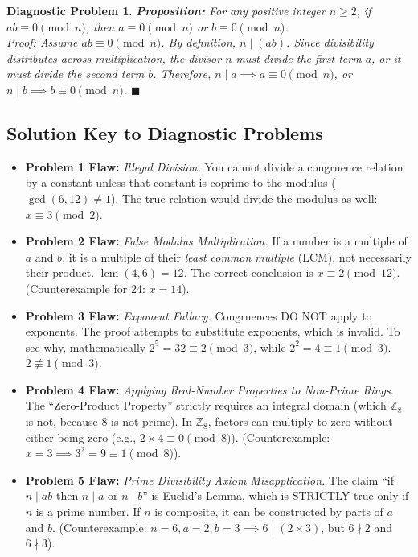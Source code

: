 \documentclass[11pt]{article}
\newtheorem{flawprob}{Diagnostic Problem}
\begin{document}
\begin{flawprob}
\textbf{Proposition:} For any positive integer $n \ge 2$, if $ab \equiv 0 \pmod n$, then $a \equiv 0 \pmod n$ or $b \equiv 0 \pmod n$. \\
\textit{Proof:} Assume $ab \equiv 0 \pmod n$. By definition, $n \mid (ab)$. Since divisibility distributes across multiplication, the divisor $n$ must divide the first term $a$, or it must divide the second term $b$. Therefore, $n \mid a \implies a \equiv 0 \pmod n$, or $n \mid b \implies b \equiv 0 \pmod n$. $\blacksquare$
\end{flawprob}

\vspace{2cm}

\subsection*{Solution Key to Diagnostic Problems}
\begin{itemize}
    \item \textbf{Problem 1 Flaw:} \textit{Illegal Division.} You cannot divide a congruence relation by a constant unless that constant is coprime to the modulus ($\gcd(6, 12) \neq 1$). The true relation would divide the modulus as well: $x \equiv 3 \pmod{2}$.
    \item \textbf{Problem 2 Flaw:} \textit{False Modulus Multiplication.} If a number is a multiple of $a$ and $b$, it is a multiple of their \textit{least common multiple} (LCM), not necessarily their product. $\operatorname{lcm}(4, 6) = 12$. The correct conclusion is $x \equiv 2 \pmod{12}$. (Counterexample for 24: $x=14$).
    \item \textbf{Problem 3 Flaw:} \textit{Exponent Fallacy.} Congruences DO NOT apply to exponents. The proof attempts to substitute exponents, which is invalid. To see why, mathematically $2^5 = 32 \equiv 2 \pmod 3$, while $2^2 = 4 \equiv 1 \pmod 3$. $2 \not\equiv 1 \pmod 3$. 
    \item \textbf{Problem 4 Flaw:} \textit{Applying Real-Number Properties to Non-Prime Rings.} The ``Zero-Product Property'' strictly requires an integral domain (which $\mathbb{Z}_8$ is not, because 8 is not prime). In $\mathbb{Z}_8$, factors can multiply to zero without either being zero (e.g., $2 \times 4 \equiv 0 \pmod 8$). (Counterexample: $x=3 \implies 3^2 = 9 \equiv 1 \pmod 8$).
    \item \textbf{Problem 5 Flaw:} \textit{Prime Divisibility Axiom Misapplication.} The claim ``if $n \mid ab$ then $n \mid a$ or $n \mid b$'' is Euclid's Lemma, which is STRICTLY true only if $n$ is a prime number. If $n$ is composite, it can be constructed by parts of $a$ and $b$. (Counterexample: $n=6, a=2, b=3 \implies 6 \mid (2 \times 3)$, but $6 \nmid 2$ and $6 \nmid 3$).
\end{itemize}
\end{document}
